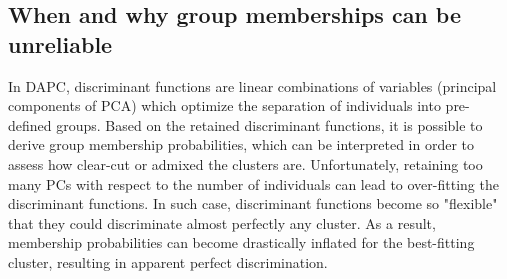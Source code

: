 \documentclass{article}
\begin{document}
\subsection{When and why group memberships can be unreliable}

In DAPC, discriminant functions are linear combinations of variables (principal components of PCA) which
optimize the separation of individuals into pre-defined groups. Based on the retained discriminant
functions, it is possible to derive group membership probabilities, which can be interpreted in
order to assess how clear-cut or admixed the clusters are.
Unfortunately, retaining too many PCs with respect to the number of individuals can lead to over-fitting the discriminant functions.
In such case, discriminant functions become so "flexible" that they could discriminate almost perfectly any cluster.
As a result, membership probabilities can become drastically inflated for the best-fitting cluster, resulting in apparent perfect discrimination.
\\
\end{document}
